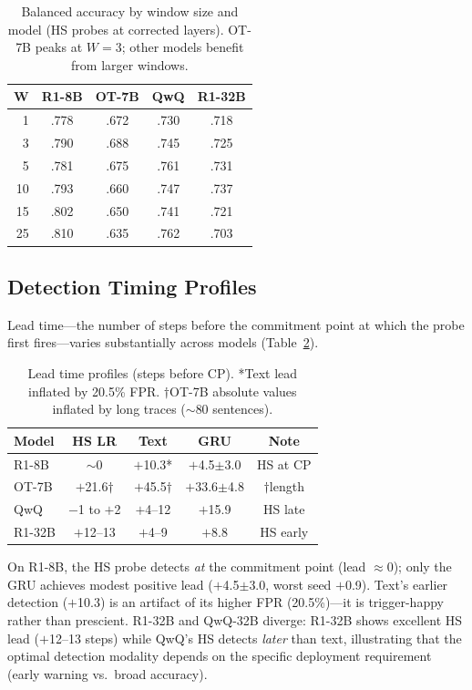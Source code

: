 \documentclass[11pt,a4paper]{article}
\begin{document}
\begin{table}[t]
\centering
\small
\begin{tabular}{rcccc}
\toprule
\textbf{W} & \textbf{R1-8B} & \textbf{OT-7B} & \textbf{QwQ} & \textbf{R1-32B} \\
\midrule
1 & .778 & .672 & .730 & .718 \\
3 & .790 & .688 & .745 & .725 \\
5 & .781 & .675 & .761 & .731 \\
10 & .793 & .660 & .747 & .737 \\
15 & .802 & .650 & .741 & .721 \\
25 & .810 & .635 & .762 & .703 \\
\bottomrule
\end{tabular}
\caption{Balanced accuracy by window size and model (HS probes at corrected layers). OT-7B peaks at $W=3$; other models benefit from larger windows.}
\label{tab:window_ablation}
\end{table}


\subsection{Detection Timing Profiles}
\label{sec:timing}

Lead time---the number of steps before the commitment point at which the probe first fires---varies substantially across models (Table~\ref{tab:lead_time}).

\begin{table}[t]
\centering
\small
\begin{tabular}{lcccc}
\toprule
\textbf{Model} & \textbf{HS LR} & \textbf{Text} & \textbf{GRU} & \textbf{Note} \\
\midrule
R1-8B & $\sim$0 & $+$10.3* & $+$4.5$\pm$3.0 & HS at CP \\
OT-7B & $+$21.6$\dagger$ & $+$45.5$\dagger$ & $+$33.6$\pm$4.8 & $\dagger$length \\
QwQ & $-$1 to $+$2 & $+$4--12 & $+$15.9 & HS late \\
R1-32B & $+$12--13 & $+$4--9 & $+$8.8 & HS early \\
\bottomrule
\end{tabular}
\caption{Lead time profiles (steps before CP). *Text lead inflated by 20.5\% FPR. $\dagger$OT-7B absolute values inflated by long traces ($\sim$80 sentences).}
\label{tab:lead_time}
\end{table}

On R1-8B, the HS probe detects \emph{at} the commitment point (lead $\approx 0$); only the GRU achieves modest positive lead ($+$4.5$\pm$3.0, worst seed $+$0.9).
Text's earlier detection ($+$10.3) is an artifact of its higher FPR (20.5\%)---it is trigger-happy rather than prescient.
R1-32B and QwQ-32B diverge: R1-32B shows excellent HS lead ($+$12--13 steps) while QwQ's HS detects \emph{later} than text, illustrating that the optimal detection modality depends on the specific deployment requirement (early warning vs.\ broad accuracy).
\end{document}

